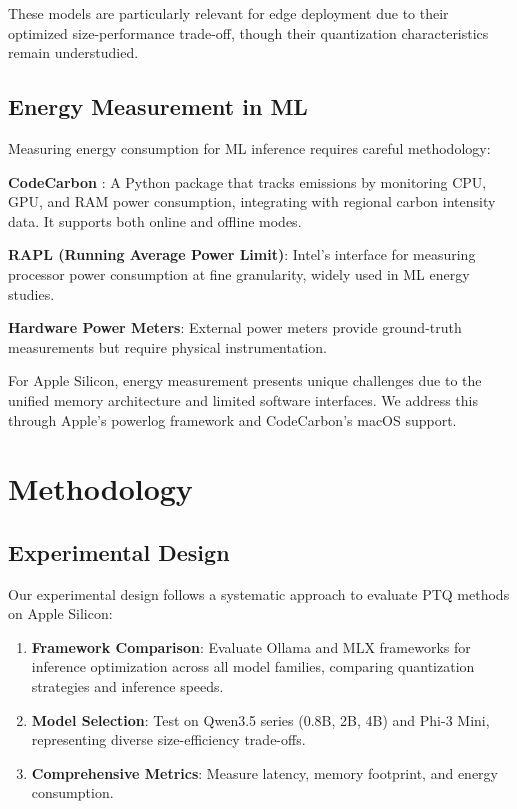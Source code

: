 \documentclass[11pt,a4paper]{article}
\begin{document}
These models are particularly relevant for edge deployment due to their optimized size-performance trade-off, though their quantization characteristics remain understudied.

\subsection{Energy Measurement in ML}

Measuring energy consumption for ML inference requires careful methodology:

\textbf{CodeCarbon} \cite{codecarbon2023}: A Python package that tracks emissions by monitoring CPU, GPU, and RAM power consumption, integrating with regional carbon intensity data. It supports both online and offline modes.

\textbf{RAPL (Running Average Power Limit)}: Intel's interface for measuring processor power consumption at fine granularity, widely used in ML energy studies.

\textbf{Hardware Power Meters}: External power meters provide ground-truth measurements but require physical instrumentation.

For Apple Silicon, energy measurement presents unique challenges due to the unified memory architecture and limited software interfaces. We address this through Apple's powerlog framework and CodeCarbon's macOS support.

\section{Methodology}

\subsection{Experimental Design}

Our experimental design follows a systematic approach to evaluate PTQ methods on Apple Silicon:

\begin{enumerate}[leftmargin=*,nosep]
    \item \textbf{Framework Comparison}: Evaluate Ollama and MLX frameworks for inference optimization across all model families, comparing quantization strategies and inference speeds.
    \item \textbf{Model Selection}: Test on Qwen3.5 series (0.8B, 2B, 4B) and Phi-3 Mini, representing diverse size-efficiency trade-offs.
    \item \textbf{Comprehensive Metrics}: Measure latency, memory footprint, and energy consumption.
\end{enumerate}
\end{document}

